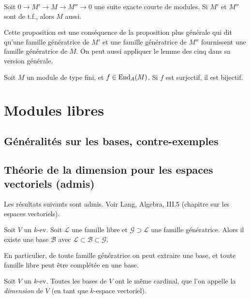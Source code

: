 \begin{proposition}
Soit $0\to M' \to M\to M'' \to 0$ une suite exacte courte de modules. Si $M'$ et $M''$ sont de t.f., alors $M$ aussi.
\end{proposition}

Cette proposition est une conséquence de la proposition plus générale qui dit qu'une famille génératrice de $M'$ et une famille génératrice de $M''$ fournissent une famille génératrice de $M$. %
On peut aussi appliquer le lemme des cinq dans sa version générale.



\begin{theoreme}
\end{theoreme}

\begin{corollaire} Soit $M$ un module de type fini, et $f \in \operatorname{End}_A(M)$. Si $f$ est surjectif, il est bijectif.
\end{corollaire}


\section{Modules libres}

\subsection{Généralités sur les bases, contre-exemples}
\subsection{Théorie de la dimension pour les espaces vectoriels (admis)}
Les résultats suivants sont admis. Voir Lang, Algebra, III.5 (chapitre sur les espaces vectoriels). 

\begin{theoreme}
Soit $V$ un $k$-ev. Soit $\mathcal L$ une famille libre et $\mathcal G\supset \mathcal L$ une famille génératrice. Alors il existe une base $\mathcal B$ avec $\mathcal L \subset\mathcal B \subset \mathcal G$.
\end{theoreme}

En particulier, de toute famille génératrice on peut extraire une base, et toute famille libre peut être complétée en une base.

\begin{theoremedef}
Soit $V$ un $k$-ev. Toutes les bases de $V$ ont le même cardinal, que l'on appelle la \emph{dimension} de $V$ (en tant que $k$-espace vectoriel).
\end{theoremedef}


